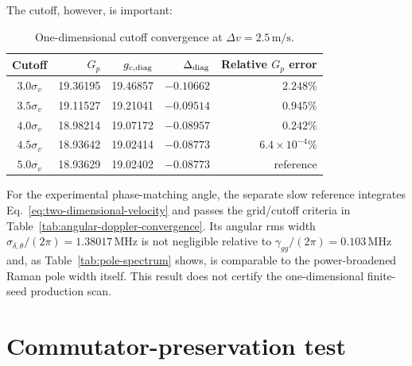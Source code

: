 \documentclass[11pt,a4paper]{article}
\newcommand{\MHz}{\,\mathrm{MHz}}
\begin{document}
The cutoff, however, is important:

\begin{table}[ht]
\centering
\caption{One-dimensional cutoff convergence at
$\Delta v=2.5\,\mathrm{m/s}$.}
\label{tab:velocity-cutoff}
\small
\begin{tabular}{c r r r r}
\toprule
Cutoff & $G_p$ & $g_{c,{\rm diag}}$ & $\Delta_{\rm diag}$ &
Relative $G_p$ error\\
\midrule
$3.0\sigma_v$ & 19.36195 & 19.46857 & $-0.10662$ & $2.248\%$\\
$3.5\sigma_v$ & 19.11527 & 19.21041 & $-0.09514$ & $0.945\%$\\
$4.0\sigma_v$ & 18.98214 & 19.07172 & $-0.08957$ & $0.242\%$\\
$4.5\sigma_v$ & 18.93642 & 19.02414 & $-0.08773$ & $6.4\times10^{-4}\%$\\
$5.0\sigma_v$ & 18.93629 & 19.02402 & $-0.08773$ & reference\\
\bottomrule
\end{tabular}
\end{table}

For the experimental phase-matching angle, the separate slow reference
integrates Eq.~\eqref{eq:two-dimensional-velocity} and passes the grid/cutoff
criteria in Table~\ref{tab:angular-doppler-convergence}. Its angular rms width
$\sigma_{\delta,\theta}/(2\pi)=1.38017\MHz$ is not negligible relative to
$\gamma_{gg}/(2\pi)=0.103\MHz$ and, as Table~\ref{tab:pole-spectrum} shows,
is comparable to the power-broadened Raman pole width itself. This result does
not certify the one-dimensional finite-seed production scan.

\clearpage
\section{Commutator-preservation test}
\end{document}
